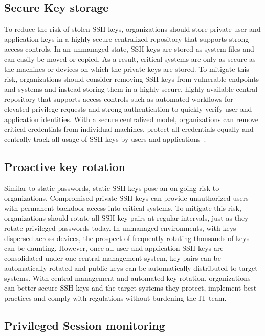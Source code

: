 \subsection{Secure Key storage}
To reduce the risk of stolen SSH keys, organizations should store 
private user and application keys in a highly-secure
centralized repository that supports strong access controls.
In an unmanaged state, SSH keys are stored as system files and can 
easily be moved or copied. As a result, critical systems are only
as secure as the machines or devices on which the private keys are
stored. To mitigate this risk, organizations should consider removing
SSH keys from vulnerable endpoints and systems and instead storing 
them in a highly secure, highly available central repository that 
supports access controls such as automated workflows for 
elevated-privilege requests and strong authentication to quickly 
verify user and application identities. With a secure centralized 
model, organizations can remove critical credentials from individual
machines, protect all credentials equally and centrally track all usage
of SSH keys by users and applications~\cite{hid-sp18-513-gutmann}.

\subsection{Proactive key rotation}

Similar to static passwords, static SSH keys pose an on-going risk
to organizations. Compromised private SSH keys can provide unauthorized
users with permanent backdoor access into critical systems. 
To mitigate this risk, organizations should rotate all SSH key 
pairs at regular intervals, just as they rotate privileged passwords
today. In unmanaged environments, with keys dispersed across devices,
the prospect of frequently rotating thousands of keys can be daunting.
However, once all user and application SSH keys are consolidated under
one central management system, key pairs can be automatically rotated
and public keys can be automatically distributed to target systems. 
With central management and automated key rotation, organizations can
better secure SSH keys and the target systems they protect, 
implement best practices and comply with regulations without burdening
the IT team\cite{hid-sp18-513-gutmann}.

\subsection{Privileged Session monitoring}

